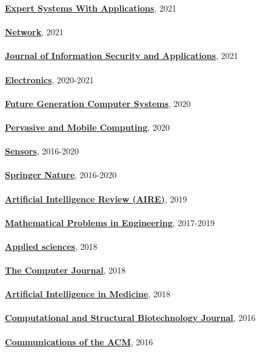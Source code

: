 \href{https://www.journals.elsevier.com/expert-systems-with-applications}{\textbf{Expert Systems With Applications}}, 2021
\\ \halfblankline \\
\href{https://www.mdpi.com/journal/network}{\textbf{Network}}, 2021
\\ \halfblankline \\
\href{https://www.journals.elsevier.com/journal-of-information-security-and-applications}{\textbf{Journal of Information Security and Applications}}, 2021
\\ \halfblankline \\
\href{https://www.mdpi.com/journal/electronics}{\textbf{Electronics}}, 2020-2021
\\ \halfblankline \\
\href{https://www.sciencedirect.com/journal/future-generation-computer-systems}{\textbf{Future Generation Computer Systems}}, 2020
\\ \halfblankline \\
\href{https://www.journals.elsevier.com/pervasive-and-mobile-computing}{\textbf{Pervasive and Mobile Computing}}, 2020
\\ \halfblankline \\
\href{http://www.mdpi.com/journal/sensors}{\textbf{Sensors}}, 2016-2020
\\ \halfblankline \\
\href{https://www.springernature.com/gp}{\textbf{Springer Nature}}, 2016-2020
\\ \halfblankline \\
\href{https://link.springer.com/journal/10462}{\textbf{Artificial Intelligence Review (AIRE)}}, 2019
\\ \halfblankline \\
\href{https://www.hindawi.com/journals/mpe/}{\textbf{Mathematical Problems in Engineering}}, 2017-2019
\\ \halfblankline \\
\href{http://www.mdpi.com/journal/applsci}{\textbf{Applied sciences}}, 2018
\\ \halfblankline \\
\href{https://academic.oup.com/comjnl}{\textbf{The Computer Journal}}, 2018
\\ \halfblankline \\
\href{https://www.journals.elsevier.com/artificial-intelligence-in-medicine/}{\textbf{Artificial Intelligence in Medicine}}, 2018
\\ \halfblankline \\
\href{https://www.journals.elsevier.com/computational-and-structural-biotechnology-journal/}{\textbf{Computational and Structural Biotechnology Journal}}, 2016
\\ \halfblankline \\
\href{http://cacm.acm.org/}{\textbf{Communications of the ACM}}, 2016
